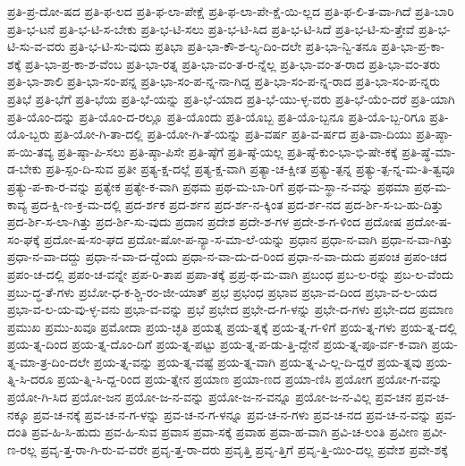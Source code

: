 {ಪ್ರತಿ-ಪ್ರ-ದೋ-ಷದ
ಪ್ರತಿ-ಫ-ಲದ
ಪ್ರತಿ-ಫ-ಲಾ-ಪೇಕ್ಷೆ
ಪ್ರತಿ-ಫ-ಲಾ-ಪೇ-ಕ್ಷೆ-ಯಿ-ಲ್ಲದ
ಪ್ರತಿ-ಫ-ಲಿ-ತ-ವಾ-ಗಿದೆ
ಪ್ರತಿ-ಬಾರಿ
ಪ್ರತಿ-ಭ-ಟನೆ
ಪ್ರತಿ-ಭ-ಟಿ-ಸ-ಬೇಕು
ಪ್ರತಿ-ಭ-ಟಿ-ಸಲು
ಪ್ರತಿ-ಭ-ಟಿ-ಸಿದ
ಪ್ರತಿ-ಭ-ಟಿ-ಸಿದೆ
ಪ್ರತಿ-ಭ-ಟಿ-ಸು-ತ್ತೇವೆ
ಪ್ರತಿ-ಭ-ಟಿ-ಸು-ವ-ವರು
ಪ್ರತಿ-ಭ-ಟಿ-ಸು-ವುದು
ಪ್ರತಿಭಾ
ಪ್ರತಿ-ಭಾ-ಕೌ-ಶ-ಲ್ಯ-ದಿಂ-ದಲೇ
ಪ್ರತಿ-ಭಾ-ನ್ವಿ-ತನೂ
ಪ್ರತಿ-ಭಾ-ಪ್ರ-ಕಾ-ಶಕ್ಕೆ
ಪ್ರತಿ-ಭಾ-ಪ್ರ-ಕಾ-ಶ-ವೆಂಬ
ಪ್ರತಿ-ಭಾ-ರತ್ನ
ಪ್ರತಿ-ಭಾ-ವಂ-ತ-ರ-ನ್ನೆಲ್ಲ
ಪ್ರತಿ-ಭಾ-ವಂ-ತ-ರಾದ
ಪ್ರತಿ-ಭಾ-ವಂ-ತರು
ಪ್ರತಿ-ಭಾ-ಶಾಲಿ
ಪ್ರತಿ-ಭಾ-ಸಂ-ಪನ್ನ
ಪ್ರತಿ-ಭಾ-ಸಂ-ಪ-ನ್ನ-ನಾ-ಗಿದ್ದ
ಪ್ರತಿ-ಭಾ-ಸಂ-ಪ-ನ್ನ-ರಾದ
ಪ್ರತಿ-ಭಾ-ಸಂ-ಪ-ನ್ನರು
ಪ್ರತಿಭೆ
ಪ್ರತಿ-ಭೆಗೆ
ಪ್ರತಿ-ಭೆಯ
ಪ್ರತಿ-ಭೆ-ಯನ್ನು
ಪ್ರತಿ-ಭೆ-ಯಾದ
ಪ್ರತಿ-ಭೆ-ಯು-ಳ್ಳ-ವರು
ಪ್ರತಿ-ಭೆ-ಯೆಂ-ದರೆ
ಪ್ರತಿ-ಯಾಗಿ
ಪ್ರತಿ-ಯೊಂ-ದನ್ನು
ಪ್ರತಿ-ಯೊಂ-ದ-ರಲ್ಲೂ
ಪ್ರತಿ-ಯೊಂದು
ಪ್ರತಿ-ಯೊಬ್ಬ
ಪ್ರತಿ-ಯೊ-ಬ್ಬನೂ
ಪ್ರತಿ-ಯೊ-ಬ್ಬ-ರಿಗೂ
ಪ್ರತಿ-ಯೊ-ಬ್ಬರು
ಪ್ರತಿ-ಯೋ-ಗಿ-ತಾ-ದಲ್ಲಿ
ಪ್ರತಿ-ಯೋ-ಗಿ-ತೆ-ಯನ್ನು
ಪ್ರತಿ-ವರ್ಷ
ಪ್ರತಿ-ವ-ರ್ಷದ
ಪ್ರತಿ-ವಾ-ದಿಯು
ಪ್ರತಿ-ಷ್ಠಾ-ಪ-ಯಿ-ತವ್ಯ
ಪ್ರತಿ-ಷ್ಠಾ-ಪಿ-ಸಲು
ಪ್ರತಿ-ಷ್ಠಾ-ಪಿಸೇ
ಪ್ರತಿ-ಷ್ಠೆಗೆ
ಪ್ರತಿ-ಷ್ಠೆ-ಯಲ್ಲ
ಪ್ರತಿ-ಷ್ಠೆ-ಕುಂ-ಭಾ-ಭಿ-ಷೇ-ಕಕ್ಕೆ
ಪ್ರತಿ-ಷ್ಥೆ-ಮಾ-ಡ-ಬೇಕು
ಪ್ರತಿ-ಸ್ಪಂ-ದಿ-ಸುವ
ಪ್ರತೀ
ಪ್ರತ್ಯ-ಕ್ಷ-ದಲ್ಲೆ
ಪ್ರತ್ಯ-ಕ್ಷ-ವಾಗಿ
ಪ್ರತ್ಯಾ-ಚ-ಕ್ಷೀತ
ಪ್ರತ್ಯು-ತ್ಪನ್ನ
ಪ್ರತ್ಯು-ತ್ಪ-ನ್ನ-ಮ-ತಿ-ತ್ವವೂ
ಪ್ರತ್ಯು-ಪ-ಕಾ-ರ-ವನ್ನು
ಪ್ರತ್ಯೇಕ
ಪ್ರತ್ಯೇ-ಕ-ವಾಗಿ
ಪ್ರಥಮ
ಪ್ರಥ-ಮ-ಬಾ-ರಿಗೆ
ಪ್ರಥ-ಮ-ಸ್ಥಾ-ನ-ವನ್ನು
ಪ್ರಥಮಾ
ಪ್ರಥ-ಮ-ಕಾವ್ಯ
ಪ್ರದ-ಕ್ಷಿ-ಣ-ಕ್ರ-ಮ-ದಲ್ಲಿ
ಪ್ರದ-ರ್ಶಕ
ಪ್ರದ-ರ್ಶನ
ಪ್ರದ-ರ್ಶ-ನ-ಕ್ಕಿಂತ
ಪ್ರದ-ರ್ಶ-ನದ
ಪ್ರದ-ರ್ಶಿ-ಸ-ಬ-ಹು-ದಿತ್ತು
ಪ್ರದ-ರ್ಶಿ-ಸ-ಲಾ-ಗಿತ್ತು
ಪ್ರದ-ರ್ಶಿ-ಸು-ವುದು
ಪ್ರದಾನ
ಪ್ರದೇಶ
ಪ್ರದೇ-ಶ-ಗಳ
ಪ್ರದೇ-ಶ-ಗ-ಳಿಂದ
ಪ್ರದೋಷ
ಪ್ರದೋ-ಷ-ಸಂ-ಘಕ್ಕೆ
ಪ್ರದೋ-ಷ-ಸಂ-ಘದ
ಪ್ರದೋ-ಷೋ-ಪ-ನ್ಯಾ-ಸ-ಮಾ-ಲೆ-ಯನ್ನು
ಪ್ರಧಾನ
ಪ್ರಧಾ-ನ-ವಾಗಿ
ಪ್ರಧಾ-ನ-ವಾ-ಗಿತ್ತು
ಪ್ರಧಾ-ನ-ವಾ-ದದ್ದು
ಪ್ರಧಾ-ನ-ವಾ-ದ-ದ್ದೆಂದು
ಪ್ರಧಾ-ನ-ವಾ-ದು-ದ-ರಿಂದ
ಪ್ರಧಾ-ನ-ವಾ-ದುದು
ಪ್ರಪಂಚ
ಪ್ರಪಂ-ಚದ
ಪ್ರಪಂ-ಚ-ದಲ್ಲಿ
ಪ್ರಪಂ-ಚ-ವನ್ನೇ
ಪ್ರಪ-ರಿ-ತಾಪ
ಪ್ರಪಾ-ತಕ್ಕೆ
ಪ್ರಪ್ರ-ಥ-ಮ-ವಾಗಿ
ಪ್ರಬಂಧ
ಪ್ರಬ-ಲ-ರನ್ನು
ಪ್ರಬ-ಲ-ವೆಂದು
ಪ್ರಬು-ದ್ಧ-ತೆ-ಗಳು
ಪ್ರಬೋ-ಧ-ಕ-ಶ್ಚಿ-ರಂ-ಜೀ-ಯಾತ್
ಪ್ರಭ
ಪ್ರಭಂಧ
ಪ್ರಭಾವ
ಪ್ರಭಾ-ವ-ದಿಂದ
ಪ್ರಭಾ-ವ-ಲ-ಯದ
ಪ್ರಭಾ-ವ-ಲ-ಯ-ವು-ಳ್ಳ-ವನು
ಪ್ರಭಾ-ವ-ವನ್ನು
ಪ್ರಭೆ
ಪ್ರಭೇದ
ಪ್ರಭೇ-ದ-ಗ-ಳನ್ನು
ಪ್ರಭೇ-ದ-ಗಳು
ಪ್ರಭೇ-ದದ
ಪ್ರಮಾಣ
ಪ್ರಮುಖ
ಪ್ರಮು-ಖವೂ
ಪ್ರಮೋದಾ
ಪ್ರಯ-ಚ್ಛತಿ
ಪ್ರಯತ್ನ
ಪ್ರಯ-ತ್ನಕ್ಕೆ
ಪ್ರಯ-ತ್ನ-ಗ-ಳಿಗೆ
ಪ್ರಯ-ತ್ನ-ಗಳು
ಪ್ರಯ-ತ್ನ-ದಲ್ಲಿ
ಪ್ರಯ-ತ್ನ-ದಿಂದ
ಪ್ರಯ-ತ್ನ-ದೊಂ-ದಿಗೆ
ಪ್ರಯ-ತ್ನ-ಪಟ್ಟು
ಪ್ರಯ-ತ್ನ-ಪ-ಡು-ತ್ತಿ-ದ್ದೇನೆ
ಪ್ರಯ-ತ್ನ-ಪೂ-ರ್ವ-ಕ-ವಾಗಿ
ಪ್ರಯ-ತ್ನ-ಮಾ-ತ್ರ-ದಿಂ-ದಲೇ
ಪ್ರಯ-ತ್ನ-ವನ್ನು
ಪ್ರಯ-ತ್ನ-ವಷ್ಟೆ
ಪ್ರಯ-ತ್ನ-ವಾಗಿ
ಪ್ರಯ-ತ್ನ-ವಿ-ಲ್ಲ-ದಿ-ದ್ದರೆ
ಪ್ರಯ-ತ್ನವು
ಪ್ರಯ-ತ್ನಿ-ಸಿ-ದರೂ
ಪ್ರಯ-ತ್ನಿ-ಸಿ-ದ್ದ-ರಿಂದ
ಪ್ರಯ-ತ್ನೇನ
ಪ್ರಯಾಣ
ಪ್ರಯಾ-ಣದ
ಪ್ರಯಾ-ಣಿಸಿ
ಪ್ರಯೋಗ
ಪ್ರಯೋ-ಗ-ವನ್ನು
ಪ್ರಯೋ-ಗಿ-ಸಿದ
ಪ್ರಯೋ-ಜನ
ಪ್ರಯೋ-ಜ-ನ-ವನ್ನು
ಪ್ರಯೋ-ಜ-ನ-ವನ್ನೂ
ಪ್ರಯೋ-ಜ-ನ-ವಿಲ್ಲ
ಪ್ರವ-ಚನ
ಪ್ರವ-ಚ-ನಕ್ಕೂ
ಪ್ರವ-ಚ-ನಕ್ಕೆ
ಪ್ರವ-ಚ-ನ-ಗ-ಳನ್ನು
ಪ್ರವ-ಚ-ನ-ಗ-ಳನ್ನೂ
ಪ್ರವ-ಚ-ನ-ಗಳು
ಪ್ರವ-ಚ-ನದ
ಪ್ರವ-ಚ-ನ-ವನ್ನು
ಪ್ರವ-ದಂತಿ
ಪ್ರವ-ಹಿ-ಸಿ-ಹುದು
ಪ್ರವ-ಹಿ-ಸುವ
ಪ್ರವಾಸ
ಪ್ರವಾ-ಸಕ್ಕೆ
ಪ್ರವಾಹ
ಪ್ರವಾ-ಹ-ವಾಗಿ
ಪ್ರವಿ-ಚ-ಲಂತಿ
ಪ್ರವೀಣ
ಪ್ರವೀ-ಣ-ರಲ್ಲ
ಪ್ರವೃ-ತ್ತ-ರಾ-ಗಿ-ರು-ವ-ವರೇ
ಪ್ರವೃ-ತ್ತ-ರಾ-ದರು
ಪ್ರವೃತ್ತಿ
ಪ್ರವೃ-ತ್ತಿಗೆ
ಪ್ರವೃ-ತ್ತಿ-ಯಿಂ-ದಲ್ಲ
ಪ್ರವೇಶ
ಪ್ರವೇ-ಶಕ್ಕೆ
}
